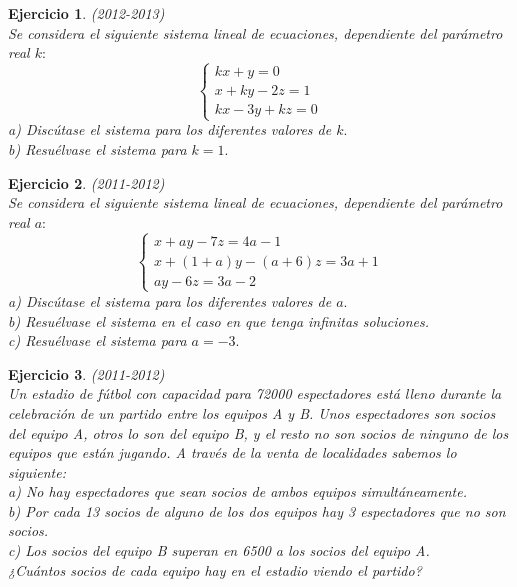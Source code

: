\documentclass[12pt, a4paper]{amsart}
\newtheorem{ejer}{Ejercicio}
\begin{document}
\begin{ejer}\em  (2012-2013)\\
Se considera el siguiente sistema lineal de ecuaciones, dependiente del parámetro real $k:$
\begin{equation*}
\left \{ \begin{matrix} kx+y=0
\\ x+ky-2z=1
\\ kx-3y+kz=0 \end{matrix}\right. 
\end{equation*}
a) Discútase el sistema para los diferentes valores de $k.$\\
b) Resuélvase el sistema para $k=1.$
\end{ejer}

\begin{ejer}\em (2011-2012)\\
Se considera el siguiente sistema lineal de ecuaciones, dependiente del parámetro real $a:$
\begin{equation*}
\left \{ \begin{matrix} x+ay-7z=4a-1
\\ x+(1+a)y -(a+6)z =3a+1
\\ ay-6z=3a-2 \end{matrix}\right. 
\end{equation*}
a) Discútase el sistema para los diferentes valores de $a.$\\
b) Resuélvase el sistema en el caso en que tenga infinitas soluciones.\\
c) Resuélvase el sistema para $a=-3.$
\end{ejer}

\begin{ejer}\em (2011-2012)\\
Un estadio de fútbol con capacidad para 72000 espectadores está lleno durante la celebración de un partido entre los equipos A y B. Unos espectadores son socios del equipo A, otros lo son del equipo B, y el resto no son socios de ninguno de los equipos que están jugando. A través de la venta de localidades sabemos lo siguiente:\\
a) No hay espectadores que sean socios de ambos equipos simultáneamente.\\
b) Por cada 13 socios de alguno de los dos equipos hay 3 espectadores que no son socios.\\
c) Los socios del equipo B superan en 6500 a los socios del equipo A.\\
¿Cuántos socios de cada equipo hay en el estadio viendo el partido?
\end{ejer}
\end{document}

